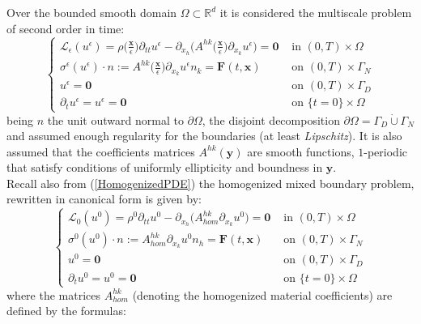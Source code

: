 Over the bounded smooth domain $\Omega \subset \mathbb{R}^d$ it is considered the multiscale problem of second order in time:
\begin{equation}
    \label{MainMultiPDE}
    \left \{
    \begin{array}{cc}
        \mathcal{L}_{\epsilon}(u^{\epsilon}) = \rho\big( \frac{\mathbf{x}}{\epsilon} \big) \partial_{tt} u^{\epsilon} - \partial_{x_h} \big( A^{hk}\big( \frac{\mathbf{x}}{\epsilon} \big) \partial_{x_k} u^{\epsilon} \big)  = \mathbf{0} & \text{ in } (0,T)\times \Omega  \\
        \sigma^{\epsilon}(u^{\epsilon})\cdot n := A^{hk}\big( \frac{\mathbf{x}}{\epsilon} \big) \partial_{x_k} u^{\epsilon} n_k  = \mathbf{F}(t,\mathbf{x}) & \text{ on } (0,T) \times \Gamma_N \\
        u^{\epsilon} =  \mathbf{0} & \text{ on } (0,T) \times \Gamma_D \\
        \partial_t u^{\epsilon} = u^{\epsilon} = \mathbf{0} & \text{ on } \{ t=0 \} \times \Omega 
    \end{array}
    \right.
\end{equation}
being $n$ the unit outward normal to $\partial \Omega$, the disjoint decomposition $\partial \Omega = \Gamma_D \dot \cup \Gamma_N$ and assumed enough regularity for the boundaries (at least \textit{Lipschitz}). It is also assumed that the coefficients matrices $A^{hk}(\mathbf{y})$ are smooth functions, $1$-periodic that satisfy conditions of uniformly ellipticity and boundness in $\mathbf{y}$.\\
Recall also from (\ref{HomogenizedPDE}) the homogenized mixed boundary problem, rewritten in canonical form is given by:
\begin{equation}
    \label{HomMultiPDE}
    \left \{
    \begin{array}{ccc}
        \mathcal{L}_0 (u^0) = \rho^0 \partial_{tt} u^0 - \partial_{x_h}\big( A^{hk}_{hom} \partial_{x_k} u^0 \big) = \mathbf{0} & \text{ in } (0,T)\times \Omega \\
        \sigma^0(u^0) \cdot n := A^{hk}_{hom} \partial_{x_k}u^0 n_h = \mathbf{F}(t, \mathbf{x}) & \text{ on } (0,T) \times \Gamma_N \\
        u^0 = \mathbf{0} & \text{ on } (0,T) \times \Gamma_D \\
        \partial_t u^0 = u^0 = \mathbf{0} & \text{ on } \{ t=0 \} \times \Omega
    \end{array}
    \right .
\end{equation}
where the matrices $A^{hk}_{hom}$ (denoting the homogenized material coefficients) are defined by the formulas:
